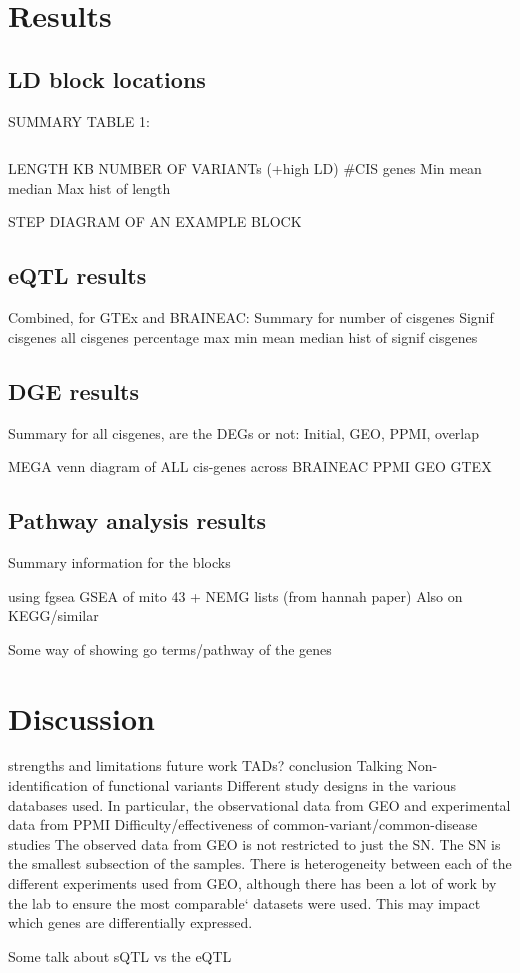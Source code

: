 \documentclass{article}
\begin{document}
\section{Results}
\subsection{LD block locations}


SUMMARY TABLE 1:
\begin{table}[h]
    \hskip-1.5cm
    \begin{tabular}{ |c|c|c|c|c|c|c|c|c| }
        \hline
        
         \hline
    \end{tabular}
\end{table}
LENGTH KB  NUMBER OF VARIANTs (+high LD)  #CIS genes
Min
mean
median
Max
hist of length


STEP DIAGRAM OF AN EXAMPLE BLOCK


\subsection{eQTL results}
Combined, for GTEx and BRAINEAC:
Summary for number of cisgenes
Signif cisgenes all cisgenes percentage
max
min
mean
median
hist of signif cisgenes


\subsection{DGE results}
Summary for all cisgenes, are the DEGs or not:
Initial, GEO, PPMI, overlap


MEGA venn diagram of ALL cis-genes across BRAINEAC PPMI GEO GTEX

\subsection{Pathway analysis results}
Summary information for the blocks

using fgsea
GSEA of mito 43 + NEMG lists (from hannah paper)
Also on KEGG/similar

Some way of showing go terms/pathway of the genes



\section{Discussion}

strengths and limitations
future work
TADs?
conclusion
Talking
Non-identification of functional variants
Different study designs in the various databases used. In particular, the observational data from GEO and experimental data from PPMI 
Difficulty/effectiveness of common-variant/common-disease studies
The observed data from GEO is not restricted to just the SN. The SN is the smallest subsection of the samples. 
There is heterogeneity between each of the different experiments used from GEO, although there has been a lot of work by the lab to ensure the most comparable` datasets were used. 
This may impact which genes are differentially expressed.

Some talk about sQTL vs the eQTL





\end{document}
